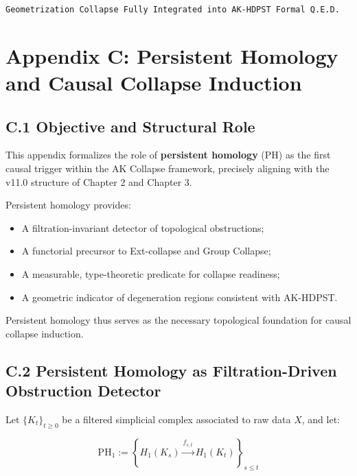 \documentclass[11pt]{article}
\begin{document}
\begin{flushright}
\texttt{Geometrization Collapse \quad Fully Integrated into AK-HDPST \quad Formal Q.E.D.}
\end{flushright}



\section*{Appendix C: Persistent Homology and Causal Collapse Induction}

\subsection*{C.1 Objective and Structural Role}

This appendix formalizes the role of \textbf{persistent homology} (PH) as the first causal trigger within the AK Collapse framework, precisely aligning with the v11.0 structure of Chapter 2 and Chapter 3.

Persistent homology provides:

\begin{itemize}
    \item A filtration-invariant detector of topological obstructions;
    \item A functorial precursor to Ext-collapse and Group Collapse;
    \item A measurable, type-theoretic predicate for collapse readiness;
    \item A geometric indicator of degeneration regions consistent with AK-HDPST.
\end{itemize}

Persistent homology thus serves as the necessary topological foundation for causal collapse induction.

\subsection*{C.2 Persistent Homology as Filtration-Driven Obstruction Detector}

Let \( \{ K_t \}_{t \geq 0} \) be a filtered simplicial complex associated to raw data \( X \), and let:

\[
\mathrm{PH}_1 := \left\{ H_1(K_s) \xrightarrow{f_{s,t}} H_1(K_t) \right\}_{s \leq t}
\]
\end{document}
